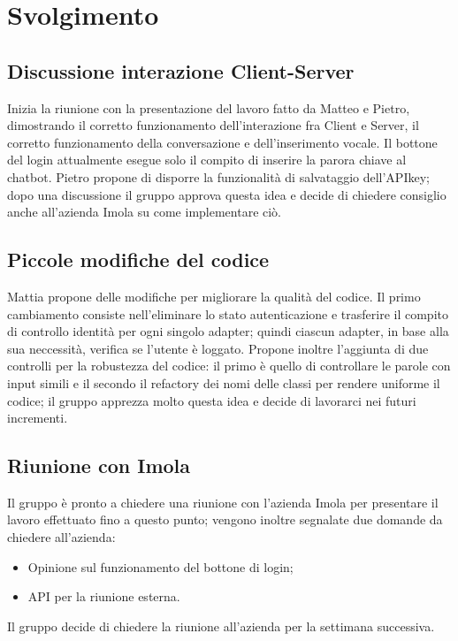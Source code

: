 \section{Svolgimento}
\subsection{Discussione interazione Client-Server}
	Inizia la riunione con la presentazione del lavoro fatto da Matteo e Pietro, dimostrando il corretto funzionamento dell'interazione fra Client e Server, il corretto funzionamento della conversazione e dell'inserimento vocale.
	Il bottone del login attualmente esegue solo il compito di inserire la parora chiave al chatbot. Pietro propone di disporre la funzionalità di salvataggio dell'APIkey; dopo una discussione il gruppo approva questa idea e decide di chiedere consiglio anche all'azienda Imola su come implementare ciò.
	
	\subsection{Piccole modifiche del codice}
	Mattia propone delle modifiche per migliorare la qualità del codice. Il primo cambiamento consiste nell'eliminare lo stato autenticazione e trasferire il compito di controllo identità per ogni singolo adapter; quindi ciascun adapter, in base alla sua neccessità, verifica se l'utente è loggato.
	Propone inoltre l'aggiunta di due controlli per la robustezza del codice: il primo è quello di controllare le parole con input simili e il secondo il refactory dei nomi delle classi per rendere uniforme il codice; il gruppo apprezza molto questa idea e decide di lavorarci nei futuri incrementi.
	
	\subsection{Riunione con Imola}
	Il gruppo è pronto a chiedere una riunione con l'azienda Imola per presentare il lavoro effettuato fino a questo punto; vengono inoltre segnalate due domande da chiedere all'azienda:
	\begin{itemize}
	\item Opinione sul funzionamento del bottone di login;
	\item API per la riunione esterna.
	\end{itemize}
	Il gruppo decide di chiedere la riunione all'azienda per la settimana successiva.


